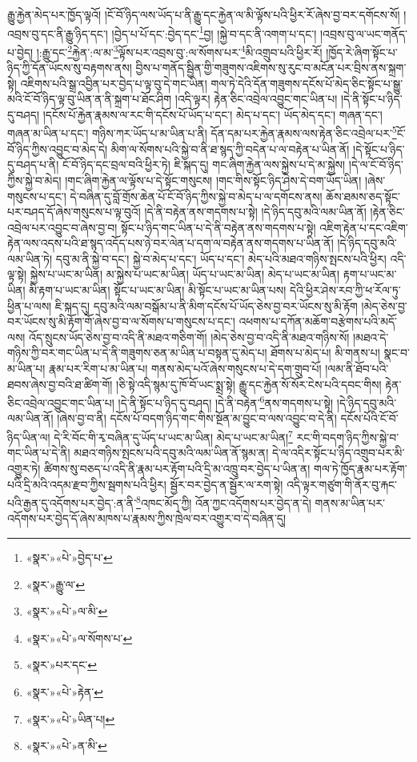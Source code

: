 རྒྱུ་རྐྱེན་མེད་པར་ཁྱོད་ལྟའོ། །ངོ་བོ་ཉིད་ལས་ཡོད་པ་ནི་རྒྱུ་དང་རྐྱེན་ལ་མི་ལྟོས་པའི་ཕྱིར་རོ་ཞེས་བྱ་བར་དགོངས་སོ། །འབྲས་བུ་དང་ནི་རྒྱུ་ཉིད་དང་། །བྱེད་པ་པོ་དང་:བྱེད་དང་\footnote{«སྣར་»«པེ་»བྱེད་པ་}བྱ། །སྐྱེ་བ་དང་ནི་འགག་པ་དང་། །འབྲས་བུ་ལ་ཡང་གནོད་པ་བྱེད། །:རྒྱུ་དང་\footnote{«སྣར་»རྒྱུ་ལ་}རྐྱེན་:ལ་མ་\footnote{«སྣར་»«པེ་»ལ་མི་}ལྟོས་པར་འབྲས་བུ་:ལ་སོགས་པར་\footnote{«སྣར་»«པེ་»ལ་སོགས་པ་}མི་འགྲུབ་པའི་ཕྱིར་རོ། །ཁྱོད་རེ་ཞིག་སྟོང་པ་ཉིད་ཀྱི་དོན་ཡོངས་སུ་བརྟགས་ནས། བྱིས་པ་གནོད་སྦྱིན་གྱི་གཟུགས་འཇིགས་སུ་རུང་བ་མངོན་པར་བྲིས་ནས་སྐྲག་སྟེ། འཇིགས་པའི་སྒྲ་འབྱིན་པར་བྱེད་པ་ལྟ་བུ་དེ་གང་ཡིན། གལ་ཏེ་དེའི་དོན་གཟུགས་དངོས་པོ་མེད་ཅིང་སྟོང་པ་སྒྱུ་མའི་ངོ་བོ་ཉིད་ལྟ་བུ་ཡིན་ན་ནི་སྐྲག་པ་ཐོང་ཤིག །འདི་ལྟར། རྟེན་ཅིང་འབྲེལ་འབྱུང་གང་ཡིན་པ། །དེ་ནི་སྟོང་པ་ཉིད་དུ་བཤད། །དངོས་པོ་རྐྱེན་རྣམས་ལ་རང་གི་དངོས་པོ་ཡོད་པ་དང་། མེད་པ་དང་། ཡོད་མེད་དང་། གཞན་དང་། གཞན་མ་ཡིན་པ་དང་། གཉིས་ཀར་ཡོད་པ་མ་ཡིན་པ་ནི། དོན་དམ་པར་རྐྱེན་རྣམས་ལས་རྟེན་ཅིང་འབྲེལ་པར་\footnote{«སྣར་»པར་དང་}ངོ་བོ་ཉིད་ཀྱིས་འབྱུང་བ་མེད་དེ། མིག་ལ་སོགས་པའི་སྐྱེ་བ་ནི་ཐ་སྙད་ཀྱི་བདེན་པ་ལ་བརྟེན་པ་ཡིན་ནོ། །དེ་སྟོང་པ་ཉིད་དུ་བཤད་པ་ནི། ངོ་བོ་ཉིད་དང་བྲལ་བའི་ཕྱིར་ཏེ། ཇི་སྐད་དུ། གང་ཞིག་རྐྱེན་ལས་སྐྱེས་པ་དེ་མ་སྐྱེས། །དེ་ལ་ངོ་བོ་ཉིད་ཀྱིས་སྐྱེ་བ་མེད། །གང་ཞིག་རྐྱེན་ལ་ལྟོས་པ་དེ་སྟོང་གསུངས། །གང་གིས་སྟོང་ཉིད་ཤེས་དེ་བག་ཡོད་ཡིན། །ཞེས་གསུངས་པ་དང་། དེ་བཞིན་དུ་བློ་གྲོས་ཆེན་པོ་ངོ་བོ་ཉིད་ཀྱིས་སྐྱེ་བ་མེད་པ་ལ་དགོངས་ནས། ཆོས་ཐམས་ཅད་སྟོང་པར་བཤད་དོ་ཞེས་གསུངས་པ་ལྟ་བུའོ། །དེ་ནི་བརྟེན་ནས་གདགས་པ་སྟེ། །དེ་ཉིད་དབུ་མའི་ལམ་ཡིན་ནོ། །རྟེན་ཅིང་འབྲེལ་པར་འབྱུང་བ་ཞེས་བྱ་བ། སྟོང་པ་ཉིད་གང་ཡིན་པ་དེ་ནི་བརྟེན་ནས་གདགས་པ་སྟེ། འཇིག་རྟེན་པ་དང་འཇིག་རྟེན་ལས་འདས་པའི་ཐ་སྙད་འདོད་པས་ཉེ་བར་ལེན་པ་དག་ལ་བརྟེན་ནས་གདགས་པ་ཡིན་ནོ། །དེ་ཉིད་དབུ་མའི་ལམ་ཡིན་ཏེ། དབུ་མ་ནི་སྐྱེ་བ་དང་། སྐྱེ་བ་མེད་པ་དང་། ཡོད་པ་དང་། མེད་པའི་མཐའ་གཉིས་སྤངས་པའི་ཕྱིར། འདི་ལྟ་སྟེ། སྐྱེས་པ་ཡང་མ་ཡིན། མ་སྐྱེས་པ་ཡང་མ་ཡིན། ཡོད་པ་ཡང་མ་ཡིན། མེད་པ་ཡང་མ་ཡིན། རྟག་པ་ཡང་མ་ཡིན། མི་རྟག་པ་ཡང་མ་ཡིན། སྟོང་པ་ཡང་མ་ཡིན། མི་སྟོང་པ་ཡང་མ་ཡིན་པས། དེའི་ཕྱིར་ཤེས་རབ་ཀྱི་ཕ་རོལ་ཏུ་ཕྱིན་པ་ལས། ཇི་སྐད་དུ། དབུ་མའི་ལམ་བསྒོམ་པ་ནི་མིག་དངོས་པོ་ཡོད་ཅེས་བྱ་བར་ཡོངས་སུ་མི་རྟོག །མེད་ཅེས་བྱ་བར་ཡོངས་སུ་མི་རྟོག་གོ་ཞེས་བྱ་བ་ལ་སོགས་པ་གསུངས་པ་དང་། འཕགས་པ་དཀོན་མཆོག་བརྩེགས་པའི་མདོ་ལས། འོད་སྲུངས་ཡོད་ཅེས་བྱ་བ་འདི་ནི་མཐའ་གཅིག་གོ། །མེད་ཅེས་བྱ་བ་འདི་ནི་མཐའ་གཉིས་སོ། །མཐའ་དེ་གཉིས་ཀྱི་བར་གང་ཡིན་པ་དེ་ནི་གཟུགས་ཅན་མ་ཡིན་པ་བསྟན་དུ་མེད་པ། ཐོགས་པ་མེད་པ། མི་གནས་པ། སྣང་བ་མ་ཡིན་པ། རྣམ་པར་རིག་པ་མ་ཡིན་པ། གནས་མེད་པའོ་ཞེས་གསུངས་པ་དེ་དག་གྲུབ་པོ། །ལམ་ནི་ཐོབ་པའི་ཐབས་ཞེས་བྱ་བའི་ཐ་ཚིག་གོ། །ཅི་སྟེ་འདི་སྙམ་དུ་ཁོ་བོ་ཡང་སྨྲ་སྟེ། རྒྱུ་དང་རྐྱེན་སོ་སོར་ངེས་པའི་དབང་གིས། རྟེན་ཅིང་འབྲེལ་འབྱུང་གང་ཡིན་པ། །དེ་ནི་སྟོང་པ་ཉིད་དུ་བཤད། །དེ་ནི་བརྟེན་\footnote{«སྣར་»«པེ་»རྟེན་}ནས་གདགས་པ་སྟེ། །དེ་ཉིད་དབུ་མའི་ལམ་ཡིན་ནོ། །ཞེས་བྱ་བ་ནི། དངོས་པོ་བདག་ཉིད་གང་གིས་སྔོན་མ་བྱུང་བ་ལས་འབྱུང་བ་དེ་ནི། དངོས་པོའི་ངོ་བོ་ཉིད་ཡིན་ལ། དེ་རི་བོང་གི་རྭ་བཞིན་དུ་ཡོད་པ་ཡང་མ་ཡིན། མེད་པ་ཡང་མ་ཡིན།\footnote{«སྣར་»«པེ་»ཡིན་པ།} རང་གི་བདག་ཉིད་ཀྱིས་སྐྱེ་བ་གང་ཡིན་པ་དེ་ནི། མཐའ་གཉིས་སྤངས་པའི་དབུ་མའི་ལམ་ཡིན་ནོ་སྙམ་ན། དེ་ལ་འདིར་སྟོང་པ་ཉིད་འགྲུབ་པར་མི་འགྱུར་ཏེ། ཚིགས་སུ་བཅད་པ་འདི་ནི་རྣམ་པར་རྟོག་པའི་དྲི་མ་འཁྲུ་བར་བྱེད་པ་ཡིན་ན། གལ་ཏེ་ཁྱོད་རྣམ་པར་རྟོག་པའི་དྲི་མའི་འདམ་རྫབ་ཀྱིས་སྦགས་པའི་ཕྱིར། སྦྱོར་བར་བྱེད་ན་སྦྱོར་ལ་རག་སྟེ། འདི་ལྟར་གཙུག་གི་ནོར་བུ་རྐང་པའི་རྒྱན་དུ་འདོགས་པར་བྱེད་:ན་ནི་\footnote{«སྣར་»«པེ་»ན་མི་}འཁང་མོད་ཀྱི། འོན་ཀྱང་འདོགས་པར་བྱེད་ན་དེ། གནས་མ་ཡིན་པར་འདོགས་པར་བྱེད་དོ་ཞེས་མཁས་པ་རྣམས་ཀྱིས་ཁྲེལ་བར་འགྱུར་བ་དེ་བཞིན་དུ། 